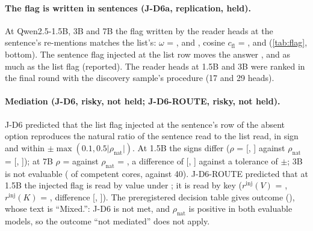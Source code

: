 \paragraph{The flag is written in sentences (J-D6a, replication, held).} At Qwen2.5-1.5B, 3B and 7B the flag written by the reader heads at the sentence's re-mentions matches the list's: $\omega$ = \JdSixaOmegaQwenOnefive{}, \JdSixaOmegaQwenThree{} and \JdSixaOmegaQwenSeven{}, cosine $c_{\mathrm{fl}}$ = \JdSixaKappaQwenOnefive{}, \JdSixaKappaQwenThree{} and \JdSixaKappaQwenSeven{} (\cref{tab:flag}, bottom). The sentence flag injected at the list row moves the answer \JdSixbQwenOnefive{}, \JdSixbQwenThree{} and \JdSixbQwenSeven{} as much as the list flag (reported). The reader heads at 1.5B and 3B were ranked in the final round with the discovery sample's procedure (17 and 29 heads).

\paragraph{Mediation (J-D6, risky, not held; J-D6-ROUTE, risky, not held).} J-D6 predicted that the list flag injected at the sentence's row of the absent option reproduces the natural ratio of the sentence read to the list read, in sign and within $\pm\max(0.1, 0.5\lvert\rho_{\mathrm{nat}}\rvert)$. At 1.5B the signs differ ($\rho$ = \JdSixRhoQwenOnefive{} [\JdSixRhoQwenOnefiveLo{}, \JdSixRhoQwenOnefiveHi{}] against $\rho_{\mathrm{nat}}$ = \JdSixRhoNatQwenOnefive{} [\JdSixRhoNatQwenOnefiveLo{}, \JdSixRhoNatQwenOnefiveHi{}]); at 7B $\rho$ = \JdSixRhoQwenSeven{} against $\rho_{\mathrm{nat}}$ = \JdSixRhoNatQwenSeven{}, a difference of \JdSixDiffQwenSeven{} [\JdSixDiffQwenSevenLo{}, \JdSixDiffQwenSevenHi{}] against a tolerance of $\pm$\JdSixTolQwenSeven{}; 3B is not evaluable (\JdGsixCompQwenThree{} of \JdGsixNQwenThree{} competent cores, against 40). J-D6-ROUTE predicted that at 1.5B the injected flag is read by value under \fmtPost{}; it is read by key ($r^{\mathrm{inj}}(V)$ = \JdSixRouteVQwenOnefive{}, $r^{\mathrm{inj}}(K)$ = \JdSixRouteKQwenOnefive{}, difference \JdSixRouteVmKQwenOnefive{} [\JdSixRouteVmKQwenOnefiveLo{}, \JdSixRouteVmKQwenOnefiveHi{}]). The preregistered decision table gives outcome (\JdSixTable{}), whose text is ``Mixed.'': J-D6 is not met, and $\rho_{\mathrm{nat}}$ is positive in both evaluable models, so the outcome ``not mediated'' does not apply. %

